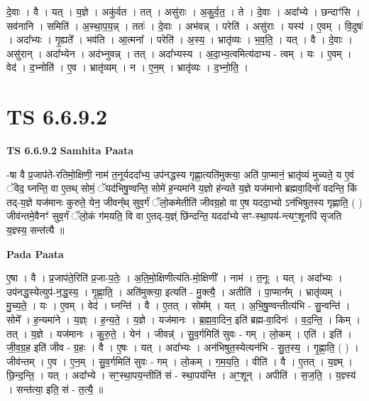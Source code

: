 \documentclass[17pt]{extarticle}
\begin{document}
दे॒वाः । वै । यत् । य॒ज्ञे । अकु॑र्वत । तत् । असु॑राः । अ॒कु॒र्व॒त॒ । ते । दे॒वाः । अदा᳚भ्ये । छन्दाꣳ॑सि । सव॑नानि । समिति॑ । अ॒स्था॒प॒य॒न्न् । ततः॑ । दे॒वाः । अभ॑वन्न् । परेति॑ । असु॑राः । यस्य॑ । ए॒वम् । वि॒दुषः॑ । अदा᳚भ्यः । गृ॒ह्यते᳚ । भव॑ति । आ॒त्मना᳚ । परेति॑ । अ॒स्य॒ । भ्रातृ॑व्यः । भ॒व॒ति॒ । यत् । वै । दे॒वाः । असु॑रान् । अदा᳚भ्येन । अद॑भ्नुवन्न् । तत् । अदा᳚भ्यस्य । अ॒दा॒भ्य॒त्वमित्य॑दाभ्य - त्वम् । यः । ए॒वम् । वेद॑ । द॒भ्नोति॑ । ए॒व । भ्रातृ॑व्यम् । न । ए॒न॒म् । भ्रातृ॑व्यः । द॒भ्नो॒ति॒ ।  \newline




\section*{ TS 6.6.9.2 }

\textbf{TS 6.6.9.2 } \newline
\textbf{Samhita Paata} \newline

-षा वै प्र॒जाप॑ते-रतिमो॒क्षिणी॒ नाम॑ त॒नूर्यददा᳚भ्य॒ उप॑नद्धस्य गृह्णा॒त्यति॑मुक्त्या॒ अति॑ पा॒प्मानं॒ भ्रातृ॑व्यं मुच्यते॒ य ए॒वं ॅवेद॒ घ्नन्ति॒ वा ए॒तथ् सोमं॒ ॅयद॑भिषु॒ण्वन्ति॒ सोमे॑ ह॒न्यमा॑ने य॒ज्ञो ह॑न्यते य॒ज्ञे यज॑मानो ब्रह्मवा॒दिनो॑ वदन्ति॒ किं तद्-य॒ज्ञे यज॑मानः कुरुते॒ येन॒ जीवन्᳚थ् सुव॒र्गं ॅलो॒कमेतीति॑ जीवग्र॒हो वा ए॒ष यददा॒भ्यो ऽन॑भिषुतस्य गृह्णाति॒ ( ) जीव॑न्तमे॒वैनꣳ॑ सुव॒र्गं ॅलो॒कं ग॑मयति॒ वि वा ए॒तद्-य॒ज्ञ्ं छि॑न्दन्ति॒ यददा᳚भ्ये सꣳ-स्था॒पय॑-न्त्यꣳ॒॒शूनपि॑ सृजति य॒ज्ञ्स्य॒ सन्त॑त्यै ॥ \newline

\textbf{Pada Paata} \newline

ए॒षा । वै । प्र॒जाप॑ते॒रिति॑ प्र॒जा-प॒तेः॒ । अ॒ति॒मो॒क्षिणीत्य॑ति-मो॒क्षिणी᳚ । नाम॑ । त॒नूः । यत् । अदा᳚भ्यः । उप॑नद्ध॒स्येत्युप॑-न॒द्ध॒स्य॒ । गृ॒ह्णा॒ति॒ । अति॑मुक्त्या॒ इत्यति॑ - मु॒क्त्यै॒ । अतीति॑ । पा॒प्मान᳚म् । भ्रातृ॑व्यम् । मु॒च्य॒ते॒ । यः । ए॒वम् । वेद॑ । घ्नन्ति॑ । वै । ए॒तत् । सोम᳚म् । यत् । अ॒भि॒षु॒ण्वन्तीत्य॑भि - सु॒न्वन्ति॑ । सोमे᳚ । ह॒न्यमा॑ने । य॒ज्ञ्ः । ह॒न्य॒ते॒ । य॒ज्ञे । यज॑मानः । ब्र॒ह्म॒वा॒दिन॒ इति॑ ब्रह्म-वा॒दिनः॑ । व॒द॒न्ति॒ । किम् । तत् । य॒ज्ञे । यज॑मानः । कु॒रु॒ते॒ । येन॑ । जीवन्न्॑ । सु॒व॒र्गमिति॑ सुवः - गम् । लो॒कम् । एति॑ । इति॑ । जी॒व॒ग्र॒ह इति॑ जीव - ग्र॒हः । वै । ए॒षः । यत् । अदा᳚भ्यः । अन॑भिषुत॒स्येत्यन॑भि - सु॒त॒स्य॒ । गृ॒ह्णा॒ति॒ ( ) । जीव॑न्तम् । ए॒व । ए॒न॒म् । सु॒व॒र्गमिति॑ सुवः - गम् । लो॒कम् । ग॒म॒य॒ति॒ । वीति॑ । वै । ए॒तत् । य॒ज्ञ्म् । छि॒न्द॒न्ति॒ । यत् । अदा᳚भ्ये । सꣳ॒॒स्था॒पय॒न्तीति॑ सं - स्था॒पय॑न्ति । अꣳ॒॒शून् । अपीति॑ । स॒ज॒ति॒ । य॒ज्ञ्स्य॑ । सन्त॑त्या॒ इति॒ सं - त॒त्यै॒ ॥  \newline
\end{document}
